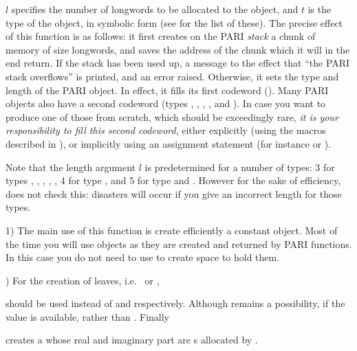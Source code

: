 $l$ specifies the number of longwords to be allocated to the
object, and $t$ is the type of the object, in symbolic
form (see  for the list of these). The precise effect of
this function is as follows: it first creates on the PARI \emph{stack} a
chunk of memory of size  longwords, and saves the address of the
chunk which it will in the end return. If the stack has been used up, a
message to the effect that ``the PARI stack overflows'' is printed,
and an error raised. Otherwise, it sets the type and length of the PARI object.
In effect, it fills its first codeword (). Many PARI
objects also have a second codeword (types , ,
, , and ). In case you want to produce one of
those from scratch, which should be exceedingly rare, \emph{it is your
responsibility to fill this second codeword}, either explicitly (using the
macros described in ), or implicitly using an assignment
statement (for instance  or ).

Note that the length argument $l$ is predetermined for a number of types:
3 for types , , , ,
, 4 for type , and 5 for type  and .
However for the sake of efficiency,  does not check this: disasters
will occur if you give an incorrect length for those types.

 1)  The main use of this function is create efficiently
a constant object. Most of the time you will use  objects as they
are created and returned by PARI functions. In this case you do not need to
use  to create space to hold them.

) For the creation of leaves, i.e.~ or ,



\noindent should be used instead of  and
 respectively. Although  remains a possibility, if the  value is available,
rather than . Finally


\noindent creates a  whose real and imaginary part are
s allocated by .

